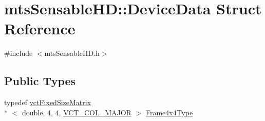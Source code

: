 \hypertarget{structmts_sensable_h_d_1_1_device_data}{\section{mts\-Sensable\-H\-D\-:\-:Device\-Data Struct Reference}
\label{structmts_sensable_h_d_1_1_device_data}
}


{\ttfamily \#include $<$mts\-Sensable\-H\-D.\-h$>$}

\subsection*{Public Types}
\begin{DoxyCompactItemize}
\item 
typedef \hyperlink{classvct_fixed_size_matrix}{vct\-Fixed\-Size\-Matrix}\\*
$<$ double, 4, 4, \hyperlink{vct_forward_declarations_8h_a432cdf8923afaf82f551450ad4034746}{V\-C\-T\-\_\-\-C\-O\-L\-\_\-\-M\-A\-J\-O\-R} $>$ \hyperlink{structmts_sensable_h_d_1_1_device_data_a46ac85be135ad15c04fbe2b06a689781}{Frame4x4\-Type}
\end{DoxyCompactItemize}
